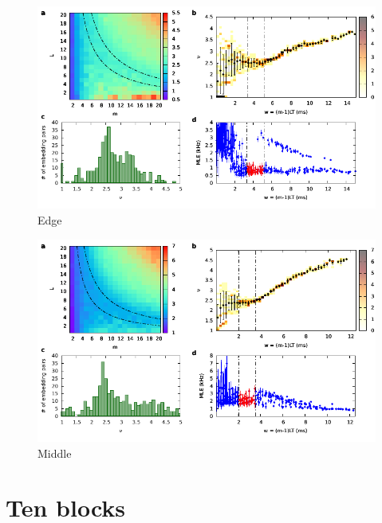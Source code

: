 \begin{figure}[H]
    \centering
    \includegraphics[width=\linewidth]{../9_blocks/edge/2e5_points/plots/chaos_low.pdf}
    \caption{Edge}
    \label{fig:9 blocks chaos}
\end{figure}

\begin{figure}[H]
    \centering
    \includegraphics[width=\linewidth]{../9_blocks/middle/2e5_points/plots/chaos_low.pdf}
    \caption{Middle}
    \label{fig:9 blocks chaos middle}
\end{figure}

\section{Ten blocks}

